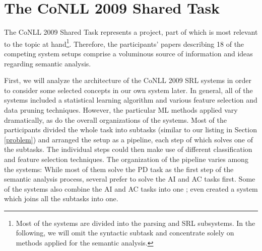 \documentclass[12pt,notitlepage,a4paper]{report}
\begin{document}
\section{The CoNLL 2009 Shared Task}\label{conll2009}

The CoNLL 2009 Shared Task represents a project, part of which is most relevant to the topic at hand\footnote{Most of the systems are divided into the parsing and SRL subsystems. In the following, we will omit the syntactic subtask and concentrate solely on methods applied for the semantic analysis.}. Therefore, the participants' papers describing 18 of the competing system setups comprise a voluminous source of information and ideas regarding semantic analysis.

First, we will analyze the architecture of the CoNLL 2009 SRL systems in order to consider some selected concepts in our own system later. In general, all of the systems included a statistical learning algorithm and various feature selection and data pruning techniques. However, the particular ML methods applied vary dramatically, as do the overall organizations of the systems. Most of the participants divided the whole task into subtasks (similar to our listing in Section \ref{problem}) and arranged the setup as a pipeline, each step of which solves one of the subtasks. The individual steps could then make use of different classification and feature selection techniques. The organization of the pipeline varies among the systems: While most of them solve the PD task as the first step of the semantic analysis process, several \citep{bohnet09,zhao09} prefer to solve the AI and AC tasks first. Some of the systems also combine the AI and AC tasks into one \citep{che09,nugues09}; \citet{meza-ruiz09} even created a system which joins all the subtasks into one.
\end{document}
